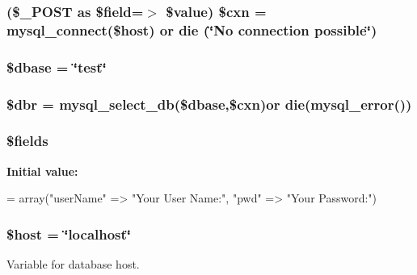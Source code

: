 \hypertarget{_m_c_mlogin_validator_8php_a67bdfa000f51c8afb4135092c68cf1d7}{
\subsubsection[{\$cxn}]{ (\$\-\_\-\-P\-O\-S\-T as \$field=$>$ \$value) \$cxn = mysql\-\_\-connect(\$host) or die (\char`\"{}No connection possible\char`\"{})}}\label{_m_c_mlogin_validator_8php_a67bdfa000f51c8afb4135092c68cf1d7}
\hypertarget{_m_c_mlogin_validator_8php_abd981912075cb8356ca370b4fefdfed7}{
\subsubsection[{\$dbase}]{\setlength{\rightskip}{0pt plus 5cm}\$dbase = \char`\"{}test\char`\"{}}}\label{_m_c_mlogin_validator_8php_abd981912075cb8356ca370b4fefdfed7}
\hypertarget{_m_c_mlogin_validator_8php_a88fea670240e5fa6ae306a286acaa0fd}{
\subsubsection[{\$dbr}]{\setlength{\rightskip}{0pt plus 5cm}\$dbr = mysql\-\_\-select\-\_\-db(\$dbase,\$cxn)or die(mysql\-\_\-error())}}\label{_m_c_mlogin_validator_8php_a88fea670240e5fa6ae306a286acaa0fd}
\hypertarget{_m_c_mlogin_validator_8php_ab2303c817e3b402b77b7f99627b9c319}{
\subsubsection[{\$fields}]{\setlength{\rightskip}{0pt plus 5cm}\$fields}}\label{_m_c_mlogin_validator_8php_ab2303c817e3b402b77b7f99627b9c319}
{\bfseries Initial value\-:}
\begin{DoxyCode}
= array(\textcolor{stringliteral}{"userName"} => \textcolor{stringliteral}{"Your User Name:"},
                    \textcolor{stringliteral}{"pwd"} => \textcolor{stringliteral}{"Your Password:"})
\end{DoxyCode}
\hypertarget{_m_c_mlogin_validator_8php_a711797613cb863ca0756df789c396bf2}{
\subsubsection[{\$host}]{\setlength{\rightskip}{0pt plus 5cm}\$host = \char`\"{}localhost\char`\"{}}}\label{_m_c_mlogin_validator_8php_a711797613cb863ca0756df789c396bf2}
Variable for database host.

